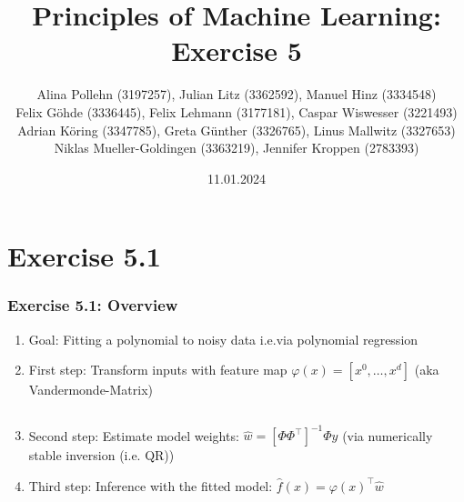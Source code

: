 \documentclass[10pt,aspectratio=169,handout]{beamer}
\begin{document}
\title{Principles of Machine Learning: Exercise 5}
\date{11.01.2024}
\author{Alina Pollehn (3197257), Julian Litz (3362592), Manuel Hinz (3334548)\\
    Felix Göhde (3336445), Felix Lehmann (3177181), Caspar Wiswesser (3221493)\\
    Adrian Köring (3347785), Greta Günther (3326765), Linus Mallwitz (3327653)\\
    Niklas Mueller-Goldingen (3363219), Jennifer Kroppen (2783393)}

\begin{frame}
    \maketitle
\end{frame}

\section{Exercise 5.1}

\begin{frame}

    \frametitle{Exercise 5.1: Overview}

    \begin{enumerate}
        \item Goal: Fitting a polynomial to noisy data i.e.via polynomial regression
        \item First step: Transform inputs with feature map $\varphi(x) = [x^0, \dots, x^d]$ {\scriptsize (aka Vandermonde-Matrix)}
        \inputminted[bgcolor=LightGray,fontsize=\small]{python}{code/vander.py}
        \item Second step: Estimate model weights: $\hat{w}=[\Phi\Phi^\intercal]^{-1}\Phi y$ {\scriptsize (via numerically stable inversion (i.e. QR))}
        \item Third step: Inference with the fitted model: $\hat{f}(x)=\varphi(x)^\intercal \hat{w}$
    \end{enumerate}
\end{frame}
\end{document}
